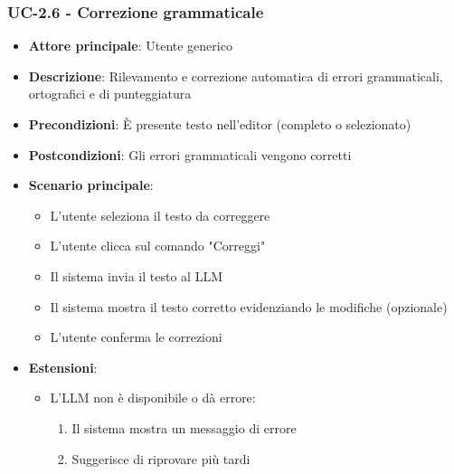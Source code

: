 \documentclass[11pt,a4paper]{article}
\begin{document}
\subsubsection{UC-2.6 - Correzione grammaticale}
\begin{itemize}
    \item \textbf{Attore principale}: Utente generico
    \item \textbf{Descrizione}: Rilevamento e correzione automatica di errori grammaticali, ortografici e di punteggiatura
    \item \textbf{Precondizioni}: È presente testo nell'editor (completo o selezionato)
    \item \textbf{Postcondizioni}: Gli errori grammaticali vengono corretti
    \item \textbf{Scenario principale}:
        \begin{itemize}
            \item L'utente seleziona il testo da correggere
            \item L'utente clicca sul comando "Correggi"
            \item Il sistema invia il testo al LLM
            \item Il sistema mostra il testo corretto evidenziando le modifiche (opzionale)
            \item L'utente conferma le correzioni
        \end{itemize}
    \item \textbf{Estensioni}:
        \begin{itemize}
            \item L'LLM non è disponibile o dà errore:
                \begin{enumerate}
                    \item Il sistema mostra un messaggio di errore
                    \item Suggerisce di riprovare più tardi
                \end{enumerate}
        \end{itemize}
\end{itemize}
\end{document}
